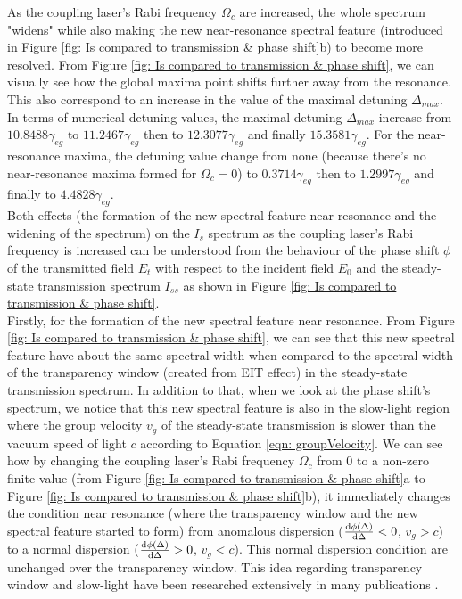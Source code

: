 As the coupling laser's Rabi frequency $\Omega_{c}$ are increased, the whole spectrum "widens" while also making the new near-resonance spectral feature (introduced in Figure \ref{fig: Is compared to transmission & phase shift}b) to become more resolved. From Figure \ref{fig: Is compared to transmission & phase shift}, we can visually see how the global maxima point shifts further away from the resonance. This also correspond to an increase in the value of the maximal detuning $\Delta_{max}$.\\

In terms of numerical detuning values, the maximal detuning $\Delta_{max}$ increase from $10.8488\gamma_{eg}$ to $11.2467\gamma_{eg}$ then to $12.3077\gamma_{eg}$ and finally $15.3581\gamma_{eg}$. For the near-resonance maxima, the detuning value change from none (because there's no near-resonance maxima formed for $\Omega_{c} = 0$) to $0.3714\gamma_{eg}$ then to $1.2997\gamma_{eg}$ and finally to $4.4828\gamma_{eg}$.\\

Both effects (the formation of the new spectral feature near-resonance and the widening of the spectrum) on the $I_{s}$ spectrum as the coupling laser's Rabi frequency is increased  can be understood from the behaviour of the phase shift $\phi$ of the transmitted field $E_{t}$ with respect to the incident field $E_{0}$ and the steady-state transmission spectrum $I_{ss}$ as shown in Figure \ref{fig: Is compared to transmission & phase shift}.\\

Firstly, for the formation of the new spectral feature near resonance. From Figure \ref{fig: Is compared to transmission & phase shift}, we can see that this new spectral feature have about the same spectral width when compared to the spectral width of the transparency window (created from EIT effect) in the steady-state transmission spectrum. In addition to that, when we look at the phase shift's spectrum, we notice that this new spectral feature is also in the slow-light region where the group velocity $v_{g}$ of the steady-state transmission is slower than the vacuum speed of light $c$ according to Equation \ref{eqn: groupVelocity}. We can see how by changing the coupling laser's Rabi frequency $\Omega_{c}$ from $0$ to a non-zero finite value (from Figure \ref{fig: Is compared to transmission & phase shift}a to Figure \ref{fig: Is compared to transmission & phase shift}b), it immediately changes the condition near resonance (where the transparency window and the new spectral feature started to form) from anomalous dispersion ($\dv{\phi(\Delta)}{\Delta} < 0$, $v_{g} > c$) to a normal dispersion ($\dv{\phi(\Delta)}{\Delta} > 0$, $v_{g} < c$). This normal dispersion condition are unchanged over the transparency window. This idea regarding transparency window and slow-light have been researched extensively in many publications \cite{jeong2010slow, MacKe2009, Jeong2009, MacKe2009, Braje2004}.\\

